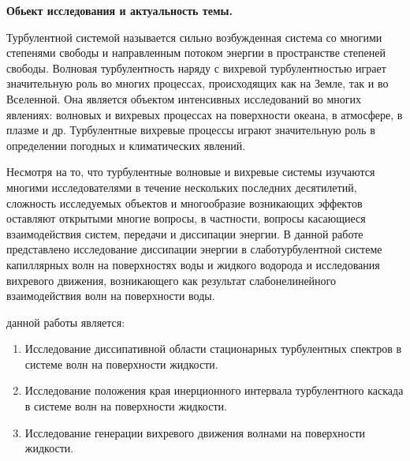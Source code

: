 
{\actuality}\textbf{Обьект исследования и актуальность темы.}

Турбулентной системой называется сильно возбужденная система со многими степенями свободы и направленным потоком энергии в пространстве степеней свободы. Волновая турбулентность наряду с вихревой турбулентностью играет значительную роль во многих процессах, происходящих как на Земле, так и во Вселенной. Она является объектом  интенсивных исследований во многих явлениях: волновых и вихревых процессах на поверхности океана, в атмосфере, в плазме и др. Турбулентные вихревые процессы играют значительную роль в определении погодных и климатических явлений. 

Несмотря на то, что турбулентные волновые и вихревые системы изучаются многими исследователями в течение нескольких последних десятилетий, сложность исследуемых объектов и многообразие возникающих эффектов оставляют открытыми многие вопросы, в частности, вопросы касающиеся взаимодействия систем, передачи и диссипации энергии. 
В данной работе представлено исследование диссипации энергии в слаботурбулентной системе капиллярных волн на поверхностях воды и жидкого водорода и исследования вихревого движения, возникающего как результат слабонелинейного взаимодействия волн на поверхности воды.

{\aim} данной работы является: 
\begin{enumerate}
	\item Исследование диссипативной области стационарных турбулентных спектров в системе волн на поверхности жидкости.
	\item Исследование положения края инерционного интервала турбулентного каскада в системе волн на поверхности жидкости.
	\item Исследование генерации вихревого движения волнами на поверхности жидкости.
\end{enumerate}

